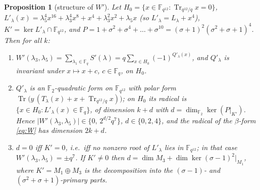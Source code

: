 \documentclass[11pt,a4paper]{amsart}
\newtheorem{proposition}[theorem]{Proposition}
\theoremstyle{definition}
\newcommand{\F}{\mathbb{F}}
\newcommand{\Tr}{\operatorname{Tr}}
\begin{document}
\begin{proposition}[structure of $W'$]\label{prop:Wp}
Let $H_0=\{x\in\F_{q^{12}}:\Tr_{q^{12}/q}x=0\}$, $L'_\lambda(x)=\lambda_5^4x^{16}+\lambda_3^4x^8+x^4+\lambda_3^2x^2+\lambda_5x$ (so $L'_\lambda=L_\lambda+x^4$), $K'=\ker L'_\lambda\cap\F_{q^{12}}$, and $P=1+\sigma^2+\sigma^4+\dots+\sigma^{10}=(\sigma+1)^2(\sigma^2+\sigma+1)^4$. Then for all $k$:
\begin{enumerate}[label=\textup{(\alph*)},leftmargin=2em]
\item $W'(\lambda_3,\lambda_5)=\sum_{\lambda_1\in\F_q}S'(\lambda)=q\sum_{x\in H_0}(-1)^{Q'_\lambda(x)}$, and $Q'_\lambda$ is invariant under $x\mapsto x+c$, $c\in\F_q$, on $H_0$.
\item $Q'_\lambda$ is an $\F_2$-quadratic form on $\F_{q^{12}}$ with polar form $\Tr\bigl(y\,(T_\lambda(x)+x+\Tr_{q^{12}/q}x)\bigr)$; on $H_0$ its radical is $\{x\in H_0:L'_\lambda(x)\in\F_q\}$, of dimension $k+d$ with $d=\dim_{\F_2}\ker(P|_{K'})$. Hence $|W'(\lambda_3,\lambda_5)|\in\{0,\,2^{d/2}q^7\}$, $d\in\{0,2,4\}$, and the radical of the $\beta$-form \eqref{eq:W} has dimension $2k+d$.
\item $d=0$ iff $K'=0$, i.e.\ iff no nonzero root of $L'_\lambda$ lies in $\F_{q^{12}}$; in that case $W'(\lambda_3,\lambda_5)=\pm q^7$. If $K'\ne0$ then $d=\dim M_3+\dim\ker(\sigma-1)^2|_{M_1}$, where $K'=M_1\oplus M_3$ is the decomposition into the $(\sigma-1)$- and $(\sigma^2+\sigma+1)$-primary parts.
\end{enumerate}
\end{proposition}
\end{document}
